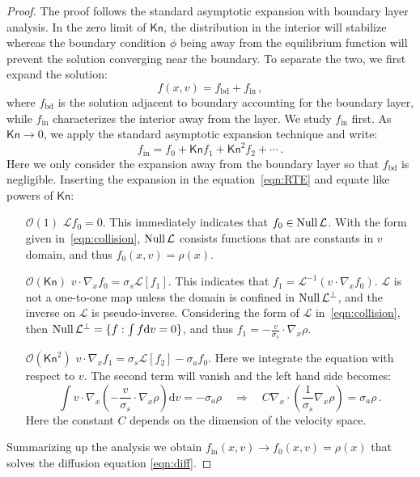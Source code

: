 \documentclass[english,reqno]{amsart}
\theoremstyle{plain}
\theoremstyle{definition} %
\newcommand{\NullL}{{\rm Null} \,\opL}
\newcommand{\opL}{\mathcal{L}}
\newcommand{\rd}{\mathrm{d}}
\newcommand{\Kn}{\mathsf{Kn}}
\begin{document}
\begin{proof}
The proof follows the standard asymptotic expansion with boundary layer analysis. In the zero limit of $\Kn$, the distribution in the interior will stabilize whereas the boundary condition $\phi$ being away from the equilibrium function will prevent the solution converging near the boundary. To separate the two, we first expand the solution:
\begin{equation}
f(x,v) = f_\text{bd} + f_\text{in}\,,
\end{equation}
where $f_\text{bd}$ is the solution adjacent to boundary accounting for the boundary layer, while $f_\text{in}$ characterizes the interior away from the layer. We study $f_\text{in}$ first. As $\Kn \rightarrow 0$, we apply the standard asymptotic expansion technique and write:
\begin{equation}
f_\text{in} = f_0 + \Kn f_1 + \Kn^2 f_2 +\cdots\,.
\end{equation}
Here we only consider the expansion away from the boundary layer so that $f_\text{bd}$ is negligible. Inserting the expansion in the equation~\eqref{eqn:RTE} and equate like powers of $\Kn$:
\begin{itemize}
\item[$\mathcal{O}(1)$] $\mathcal{L}f_0 = 0$. This immediately indicates that $f_0\in\NullL$. With the form given in~\eqref{eqn:collision}, $\NullL$ consists functions that are constants in $v$ domain, and thus $f_0(x,v)=\rho(x)$.
\item[$\mathcal{O}(\Kn)$] $v\cdot\nabla_xf_0 = \sigma_s\mathcal{L}[f_1]$. This indicates that $f_1 = \mathcal{L}^{-1}\left(v\cdot\nabla_xf_0\right)$. $\mathcal{L}$ is not a one-to-one map unless the domain is confined in $\NullL^\perp$, and the inverse on $\mathcal{L}$ is pseudo-inverse. Considering the form of $\mathcal{L}$ in~\eqref{eqn:collision}, then $\NullL^\perp = \{f:\int f\rd{v} = 0\}$, and thus $f_1 = -\frac{v}{\sigma_s}\cdot\nabla_x\rho$.
\item[$\mathcal{O}(\Kn^2)$] $v\cdot\nabla_xf_1 = \sigma_s\mathcal{L}[f_2] - \sigma_af_0$. Here we integrate the equation with respect to $v$. The second term will vanish and the left hand side becomes:
\begin{equation}\label{eqn:kn_zero_limit}
\int v\cdot\nabla_x\left(-\frac{v}{\sigma_s}\cdot\nabla_x\rho\right) \rd{v}= -\sigma_a\rho \quad\Rightarrow\quad C\nabla_x\cdot\left(\frac{1}{\sigma_s}\nabla_x\rho\right) = \sigma_a\rho\,.
\end{equation}
Here the constant $C$ depends on the dimension of the velocity space. %
\end{itemize}
Summarizing up the analysis we obtain $f_\text{in}(x,v)\to f_0(x,v) = \rho(x)$ that solves the diffusion equation \eqref{eqn:diff}.


\end{proof}
\end{document}
